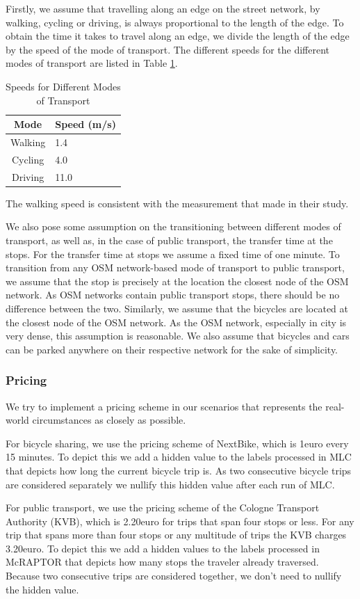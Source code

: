 Firstly, we assume that travelling along an edge on the street network, by walking, cycling or driving, is always proportional to the length of the edge.
To obtain the time it takes to travel along an edge, we divide the length of the edge by the speed of the mode of transport.
The different speeds for the different modes of transport are listed in Table \ref{table:speeds}.

\begin{table}[h]
\centering
\begin{tabular}{|c|l|}
\hline
\textbf{Mode} & \textbf{Speed (m/s)} \\
\hline
Walking & 1.4 \\
\hline
Cycling & 4.0 \\
\hline
Driving & 11.0 \\
\hline
\end{tabular}
\caption{Speeds for Different Modes of Transport}
\label{table:speeds}
\end{table}

The walking speed is consistent with the measurement that \cite{willberg15minuteCityAll2023} made in their study.

We also pose some assumption on the transitioning between different modes of transport, as well as, in the case of public transport, the transfer time at the stops.
For the transfer time at stops we assume a fixed time of one minute.
To transition from any OSM network-based mode of transport to public transport, we assume that the stop is precisely at the location the closest node of the OSM network.
As OSM networks contain public transport stops, there should be no difference between the two.
Similarly, we assume that the bicycles are located at the closest node of the OSM network.
As the OSM network, especially in city is very dense, this assumption is reasonable.
We also assume that bicycles and cars can be parked anywhere on their respective network for the sake of simplicity.


\subsubsection{Pricing}
\label{subs:pricing}

We try to implement a pricing scheme in our scenarios that represents the real-world circumstances as closely as possible.

For bicycle sharing, we use the pricing scheme of NextBike, which is 1euro every 15 minutes.
To depict this we add a hidden value to the labels processed in MLC that depicts how long the current bicycle trip is.
As two consecutive bicycle trips are considered separately we nullify this hidden value after each run of MLC.

For public transport, we use the pricing scheme of the Cologne Transport Authority (KVB), which is 2.20euro for trips that span four stops or less.
For any trip that spans more than four stops or any multitude of trips the KVB charges 3.20euro.
To depict this we add a hidden values to the labels processed in McRAPTOR that depicts how many stops the traveler already traversed.
Because two consecutive trips are considered together, we don't need to nullify the hidden value.

